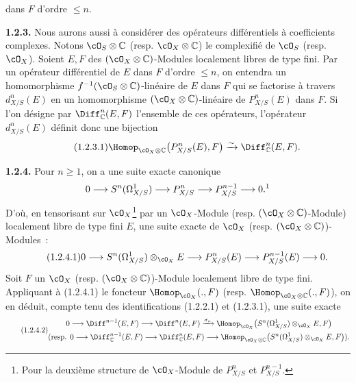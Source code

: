 dans $F$ d'ordre $\le n$.

\textbf{1.2.3.} Nous aurons aussi à considérer des opérateurs différentiels à coefficients complexes. Notons $\cO_S\otimes\mathbb C$ (resp. $\cO_X\otimes\mathbb C$) le complexifié de $\cO_S$ (resp. $\cO_X$). Soient $E,F$ des $(\cO_X\otimes\mathbb C)$-Modules localement libres de type fini. Par un opérateur différentiel de $E$ dans $F$ d'ordre $\le n$, on entendra un homomorphisme $f^{-1}(\cO_S\otimes\mathbb C)$-linéaire de $E$ dans $F$ qui se factorise à travers $d^n_{X/S}(E)$ en un homomorphisme $(\cO_X\otimes\mathbb C)$-linéaire de $P^n_{X/S}(E)$ dans $F$. Si l'on désigne par $\Diff^n_\mathbb C(E,F)$ l'ensemble de ces opérateurs, l'opérateur $d^n_{X/S}(E)$ définit donc une bijection
\begin{equation}\tag{1.2.3.1}
  \Homop_{\cO_X\otimes\mathbb C}\bigl(P^n_{X/S}(E),F\bigr)
  \xrightarrow{\sim}
  \Diff^n_\mathbb C(E,F).
\end{equation}

\textbf{1.2.4.} Pour $n\ge1$, on a une suite exacte canonique
\[
  0\longrightarrow S^n(\Omega^1_{X/S})
  \longrightarrow P^n_{X/S}
  \longrightarrow P^{n-1}_{X/S}
  \longrightarrow 0.\text{\footnotemark}
\]
%
D'où, en tensorisant sur $\cO_X$\footnote{Pour la deuxième structure de $\cO_X$-Module de $P^n_{X/S}$ et $P^{n-1}_{X/S}$.} par un $\cO_X$-Module (resp. $(\cO_X\otimes\mathbb C)$-Module) localement libre de type fini $E$, une suite exacte de $\cO_X$ (resp. $(\cO_X\otimes\mathbb C)$)-Modules~:
\begin{equation}\tag{1.2.4.1}
  0\longrightarrow S^n(\Omega^1_{X/S})\otimes_{\cO_X}E
  \longrightarrow P^n_{X/S}(E)
  \longrightarrow P^{n-1}_{X/S}(E)
  \longrightarrow 0.
\end{equation}
Soit $F$ un $\cO_X$ (resp. $(\cO_X\otimes\mathbb C)$)-Module localement libre de type fini. Appliquant à (1.2.4.1) le foncteur $\Homop_{\cO_X}(.,F)$ (resp. $\Homop_{\cO_X\otimes\mathbb C}(.,F)$), on en déduit, compte tenu des identifications (1.2.2.1) et (1.2.3.1), une suite exacte
\begin{equation}\tag{1.2.4.2}
\begin{gathered}
  0\longrightarrow \Diff^{n-1}(E,F)
  \longrightarrow \Diff^n(E,F)
  \xrightarrow{\sigma_n}
  \Homop_{\cO_X}\bigl(S^n(\Omega^1_{X/S})\otimes_{\cO_X}E,F\bigr)\\
  (\text{resp. } 0\longrightarrow \Diff^{n-1}_\mathbb C(E,F)
  \longrightarrow \Diff^n_\mathbb C(E,F)
  \longrightarrow
  \Homop_{\cO_X\otimes\mathbb C}\bigl(S^n(\Omega^1_{X/S})\otimes_{\cO_X}E,F\bigr)).
\end{gathered}
\end{equation}

